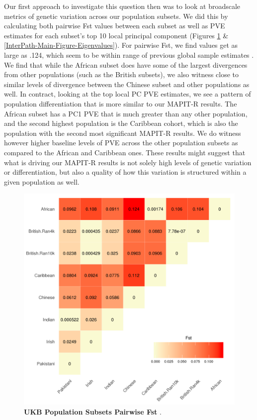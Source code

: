 \documentclass[12pt, a4paper]{article}
\begin{document}
Our first approach to investigate this question then was to look at broadscale metrics of genetic variation across our population subsets. We did this by calculating both pairwise Fst values between each subset as well as PVE estimates for each subset's top 10 local principal component (Figures \ref{InterPath-Main-Figure-Fst} \& \ref{InterPath-Main-Figure-Eigenvalues}). For pairwise Fst, we find values get as large as .124, which seem to be within range of previous global sample estimates \cite{Wang2012}. We find that while the African subset does have some of the largest divergences from other populations (such as the British subsets), we also witness close to similar levels of divergence between the Chinese subset and other populations as well. In contract, looking at the top local PC PVE estimates, we see a pattern of population differentiation that is more similar to our MAPIT-R results. The African subset has a PC1 PVE that is much greater than any other population, and the second highest population is the Caribbean cohort, which is also the population with the second most significant MAPIT-R results. We do witness however higher baseline levels of PVE across the other population subsets as compared to the African and Caribbean ones. These results might suggest that what is driving our MAPIT-R results is not solely high levels of genetic variation or differentiation, but also a quality of how this variation is structured within a given population as well.

\begin{figure}[htbp]
\centering
\includegraphics[scale=.5]{Images/Main/InterPath_Main_Figure_Fst_vs1.png}
\caption[TBD]{\textbf{UKB Population Subsets Pairwise Fst} . }
\label{InterPath-Main-Figure-Fst}
\end{figure}
\end{document}
